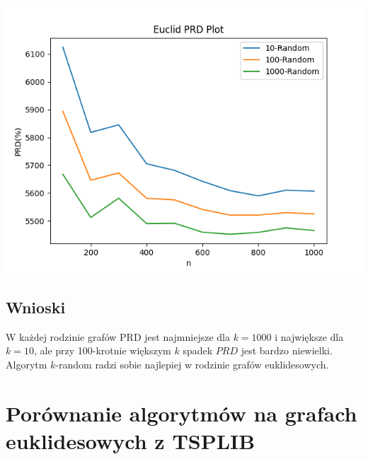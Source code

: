 \documentclass{article}
\begin{document}
\begin{center}
\includegraphics[width=\textwidth, 
                   height = 0.4\textheight, 
                   keepaspectratio]
                  {euc_k_random} 
\end{center}

\subsection{Wnioski}
W każdej rodzinie grafów PRD jest najmniejsze dla $k=1000$ i największe dla $k=10$, ale przy 100-krotnie większym $k$ spadek $PRD$ jest bardzo niewielki. Algorytm $k$-random radzi sobie najlepiej w rodzinie grafów euklidesowych. 

\newpage
\section{Porównanie algorytmów na grafach euklidesowych z TSPLIB}
\end{document}
